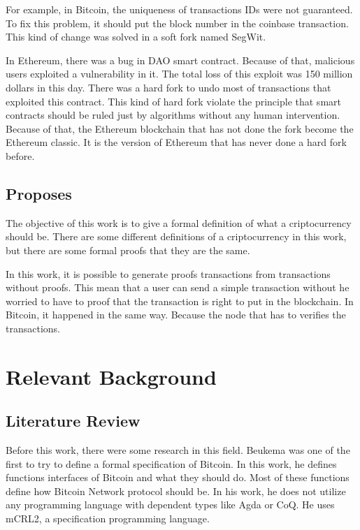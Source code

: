 \documentclass[12pt]{article}
\begin{document}
For example, in Bitcoin, the uniqueness of transactions IDs were not guaranteed.
To fix this problem, it should put the block number in the coinbase transaction.
This kind of change was solved in a soft fork named SegWit.

In Ethereum, there was a bug in DAO smart contract.
Because of that, malicious users exploited a vulnerability in it.
The total loss of this exploit was 150 million dollars in this day.
There was a hard fork to undo most of transactions that exploited this contract.
This kind of hard fork violate the principle that smart contracts should be ruled just by
algorithms without any human intervention.
Because of that, the Ethereum blockchain that has not done the fork become the Ethereum classic.
It is the version of Ethereum that has never done a hard fork before.

\subsection{Proposes}

The objective of this work is to give a formal definition of what a criptocurrency should be.
There are some different definitions of a criptocurrency in this work,
but there are some formal proofs that they are the same.

In this work, it is possible to generate proofs transactions from transactions without proofs.
This mean that a user can send a simple transaction without he worried to have to proof that
the transaction is right to put in the blockchain.
In Bitcoin, it happened in the same way.
Because the node that has to verifies the transactions.

\section{Relevant Background}

\subsection{Literature Review}

Before this work, there were some research in this field.
Beukema \cite{beukema2014formalising} was one of the first to try
to define a formal specification of Bitcoin.
In this work, he defines functions interfaces of Bitcoin and what they should do.
Most of these functions define how Bitcoin Network protocol should be.
In his work, he does not utilize any programming language with dependent types like Agda or CoQ.
He uses mCRL2, a specification programming language.
\end{document}
